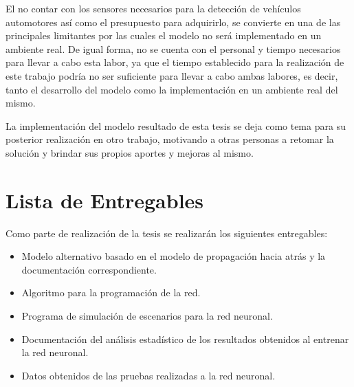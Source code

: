 		El no contar con los sensores necesarios para la detecci\'{o}n de veh\'{i}culos
	automotores  as\'{i} como el presupuesto para adquirirlo, se convierte en una de
	las principales limitantes por las cuales el modelo no ser\'{a} implementado en un
	ambiente real. De igual forma, no se cuenta con el personal y tiempo necesarios para llevar a cabo esta labor, ya que el tiempo establecido para la realizaci\'{o}n de este trabajo podr\'{i}a no ser suficiente para llevar a cabo ambas labores, es decir, tanto el desarrollo del modelo como la implementaci\'{o}n en un ambiente real del mismo.
		
		La implementaci\'{o}n del modelo resultado de esta tesis se deja como tema para su
	posterior realizaci\'{o}n en otro trabajo, motivando a otras personas a retomar la
	soluci\'{o}n y brindar sus propios aportes y mejoras al mismo.\\

\section{Lista de Entregables}

Como parte de realizaci\'{o}n de la tesis se realizar\'{a}n los siguientes entregables:

\begin{itemize}
  \item Modelo alternativo basado en el modelo de propagaci\'{o}n hacia atr\'{a}s y la
  documentaci\'{o}n correspondiente.
  \item Algoritmo para la programaci\'{o}n de la red.
  \item Programa de simulaci\'{o}n de escenarios para la red  neuronal.
  \item Documentaci\'{o}n del an\'{a}lisis estad\'{i}stico de los resultados obtenidos al
  entrenar la red neuronal.
  \item Datos obtenidos de las pruebas realizadas a la red neuronal.
\end{itemize}